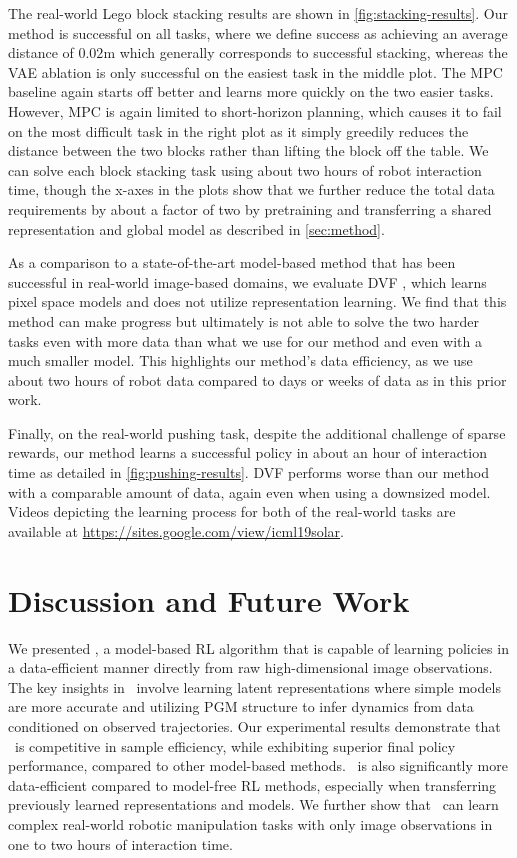 The real-world Lego block stacking results are shown in \autoref{fig:stacking-results}. Our method is successful on all tasks, where we define success as achieving an average distance of $0.02$m which generally corresponds to successful stacking, whereas the VAE ablation is only successful on the easiest task in the middle plot. The MPC baseline again starts off better and learns more quickly on the two easier tasks. However, MPC is again limited to short-horizon planning, which causes it to fail on the most difficult task in the right plot as it simply greedily reduces the distance between the two blocks rather than lifting the block off the table. We can solve each block stacking task using about two hours of robot interaction time, though the x-axes in the plots show that we further reduce the total data requirements by about a factor of two by pretraining and transferring a shared representation and global model as described in \autoref{sec:method}.

As a comparison to a state-of-the-art model-based method that has been successful in real-world image-based domains, we evaluate DVF \citep{vf}, which learns pixel space models and does not utilize representation learning. We find that this method can make progress but ultimately is not able to solve the two harder tasks even with more data than what we use for our method and even with a much smaller model. This highlights our method's data efficiency, as we use about two hours of robot data compared to days or weeks of data as in this prior work.

Finally, on the real-world pushing task, despite the additional challenge of sparse rewards, our method learns a successful policy in about an hour of interaction time as detailed in \autoref{fig:pushing-results}. DVF performs worse than our method with a comparable amount of data, again even when using a downsized model. Videos depicting the learning process for both of the real-world tasks are available at \mbox{\footnotesize{\url{https://sites.google.com/view/icml19solar}}.}


\section{Discussion and Future Work}
\label{sec:discussion}

We presented \metabbr, a model-based RL algorithm that is capable of learning policies in a data-efficient manner directly from raw high-dimensional image observations. The key insights in \metabbr\ involve learning latent representations where simple models are more accurate and utilizing PGM structure to infer dynamics from data conditioned on observed trajectories. Our experimental results demonstrate that \metabbr\ is competitive in sample efficiency, while exhibiting superior final policy performance, compared to other model-based methods. \metabbr\ is also significantly more data-efficient compared to model-free RL methods, especially when transferring previously learned representations and models. We further show that \metabbr\ can learn complex real-world robotic manipulation tasks with only image observations in one to two hours of interaction time.

